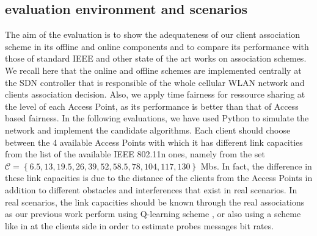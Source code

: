 \documentclass[journal,transmag]{IEEEtran}
\begin{document}
\subsection{evaluation environment and scenarios}
The aim of the evaluation is to show the adequateness of our client association scheme in its offline and online components and to compare its performance with those of standard IEEE and other state of the art works on association schemes. 
We recall here that the online and offline schemes are implemented centrally at the SDN controller that is responsible of the whole cellular WLAN network and clients association decision. Also, we apply time fairness for ressource sharing at the level of each Access Point, as its performance is better than that of Access based fairness. In the following evaluations, we have used Python to simulate the network and implement the candidate algorithms. Each client should choose between the 4 available Access Points with which it has different link capacities from the list of the available IEEE 802.11n ones, namely from the set $\mathscr{C}=\left\{6.5,13,19.5,26,39,52,58.5,78,104,117,130\right\}$ Mbs. In fact, the difference in these link capacities is due to the distance of the clients from the Access Points in addition to different obstacles and interferences that exist in real scenarios. In real scenarios, the link capacities should be known through the real associations as our previous work perform using Q-learning scheme \cite{19reinforcement_learning}, or also using a scheme like in \cite{04Fairness_load_balancing_WLAN} at the clients side in order to estimate probes messages bit rates. 

\end{document}
